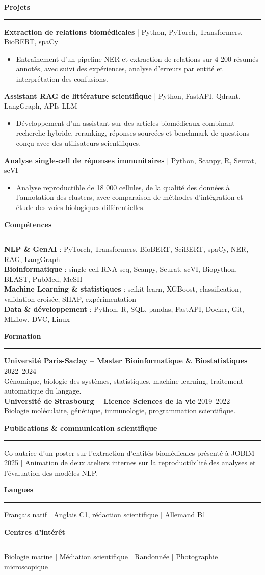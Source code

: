 \documentclass[10pt,a4paper]{article}
\newcommand{\cvsection}[1]{\par\vspace{3pt}\textbf{\large #1}\par\vspace{0.5pt}\rule{\linewidth}{0.35pt}\vspace{1pt}}
\begin{document}
\cvsection{Projets}
\textbf{Extraction de relations biomédicales} | Python, PyTorch, Transformers, BioBERT, spaCy
\begin{itemize}
\item Entraînement d'un pipeline NER et extraction de relations sur 4 200 résumés annotés, avec suivi des expériences, analyse d'erreurs par entité et interprétation des confusions.
\end{itemize}
\textbf{Assistant RAG de littérature scientifique} | Python, FastAPI, Qdrant, LangGraph, APIs LLM
\begin{itemize}
\item Développement d'un assistant sur des articles biomédicaux combinant recherche hybride, reranking, réponses sourcées et benchmark de questions conçu avec des utilisateurs scientifiques.
\end{itemize}
\textbf{Analyse single-cell de réponses immunitaires} | Python, Scanpy, R, Seurat, scVI
\begin{itemize}
\item Analyse reproductible de 18 000 cellules, de la qualité des données à l'annotation des clusters, avec comparaison de méthodes d'intégration et étude des voies biologiques différentielles.
\end{itemize}

\cvsection{Compétences}
\textbf{NLP \& GenAI} : PyTorch, Transformers, BioBERT, SciBERT, spaCy, NER, RAG, LangGraph\\
\textbf{Bioinformatique} : single-cell RNA-seq, Scanpy, Seurat, scVI, Biopython, BLAST, PubMed, MeSH\\
\textbf{Machine Learning \& statistiques} : scikit-learn, XGBoost, classification, validation croisée, SHAP, expérimentation\\
\textbf{Data \& développement} : Python, R, SQL, pandas, FastAPI, Docker, Git, MLflow, DVC, Linux

\cvsection{Formation}
\textbf{Université Paris-Saclay -- Master Bioinformatique \& Biostatistiques} \hfill 2022--2024\\
Génomique, biologie des systèmes, statistiques, machine learning, traitement automatique du langage.\\
\textbf{Université de Strasbourg -- Licence Sciences de la vie} \hfill 2019--2022\\
Biologie moléculaire, génétique, immunologie, programmation scientifique.

\cvsection{Publications \& communication scientifique}
Co-autrice d'un poster sur l'extraction d'entités biomédicales présenté à JOBIM 2025 | Animation de deux ateliers internes sur la reproductibilité des analyses et l'évaluation des modèles NLP.

\cvsection{Langues}
Français natif | Anglais C1, rédaction scientifique | Allemand B1

\cvsection{Centres d'intérêt}
Biologie marine | Médiation scientifique | Randonnée | Photographie microscopique
\end{document}
